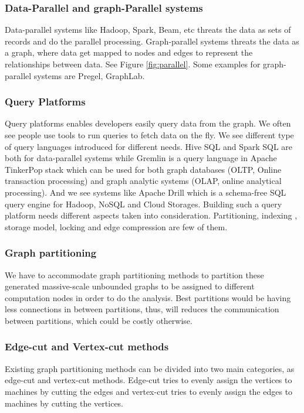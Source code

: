\documentclass[12pt]{article}
\begin{document}
\subsubsection{Data-Parallel and graph-Parallel systems}

Data-parallel systems like Hadoop, Spark, Beam, etc threats the data as sets of records and do the parallel processing. Graph-parallel systems threats the data as a graph, where data get mapped to nodes and edges to represent the relationships between data. See Figure \ref{fig:parallel}. Some examples for graph-parallel systems are Pregel, GraphLab.

\subsubsection{Query Platforms}
Query platforms enables developers easily query data from the graph. We often see people use tools to run queries to fetch data on the fly. We see different type of query languages introduced for different needs. Hive SQL and Spark SQL are both for data-parallel systems while Gremlin is a query language in Apache TinkerPop stack which can be used for both graph databases (OLTP, Online transaction processing) and graph analytic systems (OLAP, online analytical processing). And we see systems like Apache Drill which is a schema-free SQL query engine for Hadoop, NoSQL and Cloud Storages. Building such a query platform needs different aspects taken into consideration. Partitioning, indexing , storage model, locking and edge compression are few of them. 

\subsubsection{Graph partitioning}

We have to accommodate graph partitioning methods to partition these generated massive-scale unbounded graphs to be assigned to  different computation nodes in order to do the analysis. Best partitions would be having less connections in between partitions, thus, will reduces the communication between partitions, which could be costly otherwise.

\subsubsection{Edge-cut and Vertex-cut methods}

Existing graph partitioning methods can be divided into two main categories, as edge-cut and vertex-cut methods. Edge-cut tries to evenly assign the vertices to machines by cutting the edges and vertex-cut tries to evenly assign the edges to machines by cutting the vertices. 
\end{document}
